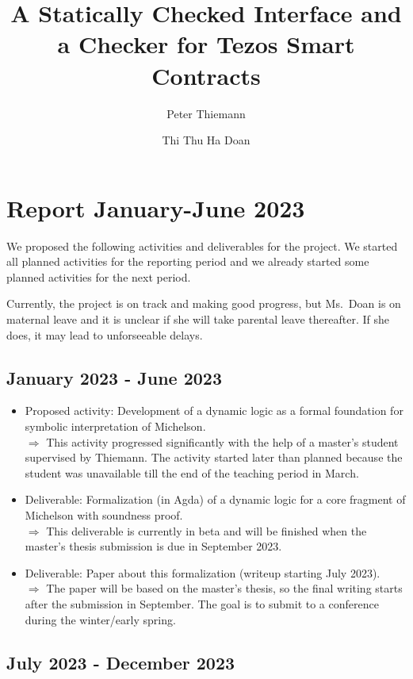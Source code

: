 \documentclass[a4paper,11pt]{article}
\title{A Statically Checked Interface and a Checker for Tezos Smart Contracts}
\author{Peter Thiemann}
\author{Thi Thu Ha Doan}
\affil{University of Freiburg, Germany}
\begin{document}
\maketitle{}

\section{Report January-June 2023}
\label{sec:executive-summary}

We proposed the following activities and deliverables for the
project. We started all planned activities for the reporting period
and we already started some planned activities for the next period.

Currently, the project is on track and making good progress, but Ms.\ Doan is on maternal leave
and it is unclear if she will take parental leave thereafter. If she
does, it may lead to unforseeable delays.

\subsection{January 2023 - June 2023}

\begin{itemize}
\item Proposed activity: Development of a dynamic logic as a formal foundation for symbolic interpretation of Michelson. \\
  $\Rightarrow$ This activity progressed significantly with the help of a master's
  student supervised by Thiemann. The activity started later than
  planned because the student was unavailable till the end of the
  teaching period in March.
\item Deliverable: Formalization (in Agda) of a dynamic logic for a core fragment of Michelson with soundness proof. \\
  $\Rightarrow$ This deliverable is currently in beta and will be finished when the
  master's thesis submission is due in September 2023.
\item Deliverable: Paper about this formalization (writeup starting
  July 2023). \\
  $\Rightarrow$ The paper will be based on the master's thesis, so the final writing
  starts after the submission in September. The goal is to submit to a
  conference during the winter/early spring.
\end{itemize}

\subsection{July 2023 - December 2023}
\label{sec:july-2023-december}
\end{document}
